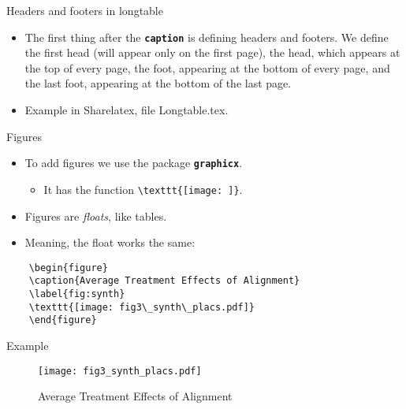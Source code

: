 \documentclass{beamer}
\newcommand{\bftt}[1]{\textbf{\texttt{#1}}}
\newcommand{\cmd}[1]{{\color[HTML]{008000}\bftt{#1}}}
\begin{document}
\begin{frame}[fragile]{Headers and footers in longtable}
\begin{itemize}
\item The first thing after the \cmd{caption} is defining headers and footers. We define the first head (will appear only on the first page), the head, which appears at the top of every page, the foot, appearing at the bottom of every page, and the last foot, appearing at the bottom of the last page.
\item Example in Sharelatex, file Longtable.tex.
\end{itemize}
\end{frame}

\begin{frame}[fragile]{Figures}
	\begin{itemize}
		\item To add figures we use the package \cmd{graphicx}.
		\begin{itemize}
			\item It has the function \verb|\texttt{[image: ]}|.
		\end{itemize}
		\item Figures are \textit{floats}, like tables.
		\item Meaning, the float works the same:
	\end{itemize}
	\begin{verbatim}
	\begin{figure}
	\caption{Average Treatment Effects of Alignment}
	\label{fig:synth}
	\texttt{[image: fig3\_synth\_placs.pdf]}
	\end{figure}
	\end{verbatim}
\end{frame}

\begin{frame}{Example}
	\begin{figure}
		\caption{Average Treatment Effects of Alignment}
		\label{fig:synth}
		\texttt{[image: fig3\_synth\_placs.pdf]}
	\end{figure}
\end{frame}
\end{document}

